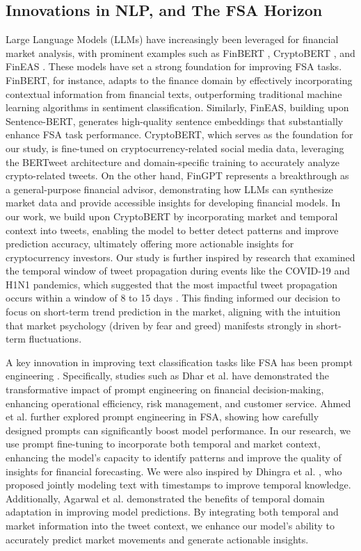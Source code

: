 \subsection{Innovations in NLP, and The FSA Horizon}
Large Language Models (LLMs) have increasingly been leveraged for financial market analysis, with prominent examples such as FinBERT \cite{huang2023finbert}, CryptoBERT \cite{sentiment_kulakowski_2023}, and FinEAS \cite{fineas_gutirrezfandio_2021}. These models have set a strong foundation for improving FSA tasks. FinBERT, for instance, adapts to the finance domain by effectively incorporating contextual information from financial texts, outperforming traditional machine learning algorithms in sentiment classification. Similarly, FinEAS, building upon Sentence-BERT, generates high-quality sentence embeddings that substantially enhance FSA task performance. CryptoBERT, which serves as the foundation for our study, is fine-tuned on cryptocurrency-related social media data, leveraging the BERTweet architecture and domain-specific training to accurately analyze crypto-related tweets. On the other hand, FinGPT \cite{fingpt_yang_2023} represents a breakthrough as a general-purpose financial advisor, demonstrating how LLMs can synthesize market data and provide accessible insights for developing financial models. In our work, we build upon CryptoBERT by incorporating market and temporal context into tweets, enabling the model to better detect patterns and improve prediction accuracy, ultimately offering more actionable insights for cryptocurrency investors. Our study is further inspired by research that examined the temporal window of tweet propagation during events like the COVID-19 and H1N1 pandemics, which suggested that the most impactful tweet propagation occurs within a window of 8 to 15 days \cite{valle2022does, whether_aysan_2023}. This finding informed our decision to focus on short-term trend prediction in the market, aligning with the intuition that market psychology (driven by fear and greed) manifests strongly in short-term fluctuations.

A key innovation in improving text classification tasks like FSA has been prompt engineering \cite{promptlearning_zhu_2022}. Specifically, studies such as Dhar et al. \cite{analysis_dhar_2023} have demonstrated the transformative impact of prompt engineering on financial decision-making, enhancing operational efficiency, risk management, and customer service. Ahmed et al. \cite{leveraging_ahmed_2024} further explored prompt engineering in FSA, showing how carefully designed prompts can significantly boost model performance. In our research, we use prompt fine-tuning to incorporate both temporal and market context, enhancing the model's capacity to identify patterns and improve the quality of insights for financial forecasting. We were also inspired by Dhingra et al. \cite{timeaware_dhingra_2021}, who proposed jointly modeling text with timestamps to improve temporal knowledge. Additionally, Agarwal et al. \cite{natural_xing_2018} demonstrated the benefits of temporal domain adaptation in improving model predictions. By integrating both temporal and market information into the tweet context, we enhance our model's ability to accurately predict market movements and generate actionable insights.

